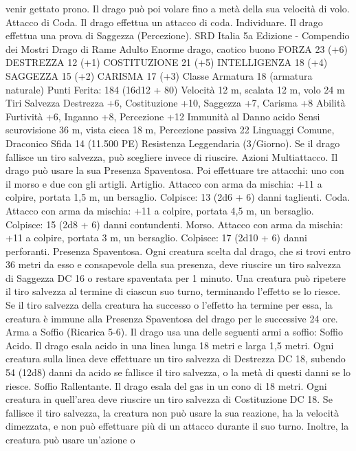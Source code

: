\begin{multicols}{2}
venir gettato prono. Il drago può poi volare fino a metà della sua
velocità di volo.
Attacco di Coda. Il drago effettua un attacco di coda.
Individuare. Il drago effettua una prova di Saggezza
(Percezione).
SRD Italia 5a Edizione - Compendio dei Mostri
Drago di Rame Adulto
Enorme drago, caotico buono
FORZA 23 (+6)
DESTREZZA 12 (+1)
COSTITUZIONE 21 (+5)
INTELLIGENZA 18 (+4)
SAGGEZZA 15 (+2)
CARISMA 17 (+3)
Classe Armatura 18 (armatura naturale)
\hspace*{0pt}\hfill{Punti Ferita}: 184 (16d12 + 80)
Velocità 12 m, scalata 12 m, volo 24 m
Tiri Salvezza Destrezza +6, Costituzione +10, Saggezza +7, Carisma +8
Abilità Furtività +6, Inganno +8, Percezione +12
Immunità al Danno acido
Sensi scurovisione 36 m, vista cieca 18 m, Percezione passiva 22
Linguaggi Comune, Draconico
Sfida 14 (11.500 PE)
Resistenza Leggendaria (3/Giorno). Se il drago fallisce un tiro
salvezza, può scegliere invece di riuscire.
Azioni
Multiattacco. Il drago può usare la sua Presenza Spaventosa. Poi
effettuare tre attacchi: uno con il morso e due con gli artigli.
Artiglio. Attacco con arma da mischia: +11 a colpire, portata 1,5
m, un bersaglio.
Colpisce: 13 (2d6 + 6) danni taglienti.
Coda. Attacco con arma da mischia: +11 a colpire, portata 4,5
m, un bersaglio.
Colpisce: 15 (2d8 + 6) danni contundenti.
Morso. Attacco con arma da mischia: +11 a colpire, portata 3 m,
un bersaglio.
Colpisce: 17 (2d10 + 6) danni perforanti.
Presenza Spaventosa. Ogni creatura scelta dal drago, che si trovi
entro 36 metri da esso e consapevole della sua presenza, deve
riuscire un tiro salvezza di Saggezza DC 16 o restare spaventata per
1 minuto. Una creatura può ripetere il tiro salvezza al termine di
ciascun suo turno, terminando l’effetto se lo riesce. Se il tiro salvezza
della creatura ha successo o l’effetto ha termine per essa, la creatura è
immune alla Presenza Spaventosa del drago per le successive 24 ore.
Arma a Soffio (Ricarica 5-6). Il drago usa una delle seguenti armi
a soffio:
Soffio Acido. Il drago esala acido in una linea lunga 18 metri e larga
1,5 metri. Ogni creatura sulla linea deve effettuare un tiro salvezza di
Destrezza DC 18, subendo 54 (12d8) danni da acido se fallisce il tiro
salvezza, o la metà di questi danni se lo riesce.
Soffio Rallentante. Il drago esala del gas in un cono di 18 metri. Ogni
creatura in quell’area deve riuscire un tiro salvezza di Costituzione
DC 18. Se fallisce il tiro salvezza, la creatura non può usare la sua
reazione, ha la velocità dimezzata, e non può effettuare più di un
attacco durante il suo turno. Inoltre, la creatura può usare un’azione o

\end{multicols}
